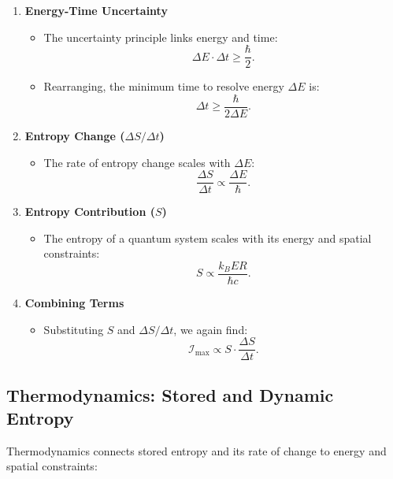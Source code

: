 \documentclass[12pt]{article}
\begin{document}
\begin{enumerate}
    \item \textbf{Energy-Time Uncertainty}
    \begin{itemize}
        \item The uncertainty principle links energy and time:
        \[
        \Delta E \cdot \Delta t \geq \frac{\hbar}{2}.
        \]
        \item Rearranging, the minimum time to resolve energy \(\Delta E\) is:
        \[
        \Delta t \geq \frac{\hbar}{2 \Delta E}.
        \]
    \end{itemize}

    \item \textbf{Entropy Change (\(\Delta S / \Delta t\))}
    \begin{itemize}
        \item The rate of entropy change scales with \(\Delta E\):
        \[
        \frac{\Delta S}{\Delta t} \propto \frac{\Delta E}{\hbar}.
        \]
    \end{itemize}

    \item \textbf{Entropy Contribution (\(S\))}
    \begin{itemize}
        \item The entropy of a quantum system scales with its energy and spatial constraints:
        \[
        S \propto \frac{k_B E R}{\hbar c}.
        \]
    \end{itemize}

    \item \textbf{Combining Terms}
    \begin{itemize}
        \item Substituting \(S\) and \(\Delta S / \Delta t\), we again find:
        \[
        \mathcal{I}_{\text{max}} \propto S \cdot \frac{\Delta S}{\Delta t}.
        \]
    \end{itemize}
\end{enumerate}

\subsection{Thermodynamics: Stored and Dynamic Entropy}
Thermodynamics connects stored entropy and its rate of change to energy and spatial constraints:
\end{document}
